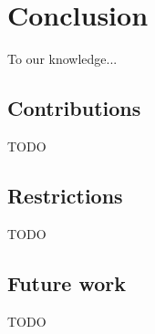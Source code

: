 \chapter{Conclusion}

To our knowledge...


\section{Contributions}

TODO


\section{Restrictions}

TODO


\section{Future work}

TODO